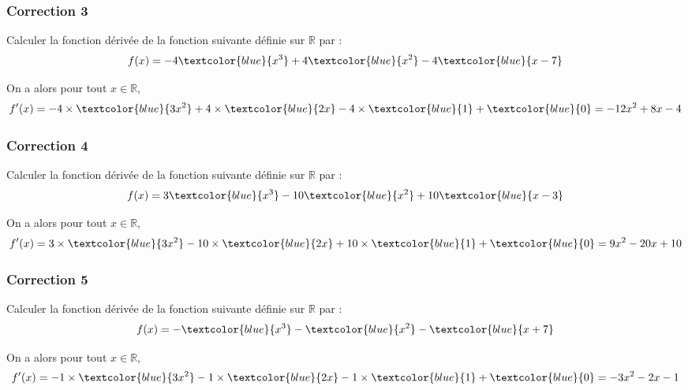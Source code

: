 \documentclass[15pt, mathserif]{beamer}
\newcommand{\R}{\mathbb{R}}			%
\begin{document}
\begin{frame}
\vspace{-10mm}
	\frametitle{Correction 3}
Calculer la fonction dérivée de la fonction suivante définie sur $\R$ par : $$f(x)=-4\textcolor{blue}{x^3}+4\textcolor{blue}{x^2}-4\textcolor{blue}{x-7}$$
 
 On a alors pour tout $x \in  \R$, $$f'(x)= -4\times \textcolor{blue}{3x^2} +4\times \textcolor{blue}{2x}-4\times \textcolor{blue}{1}+\textcolor{blue}{0}=-12x^2+8x-4$$\end{frame}


\begin{frame}
\vspace{-10mm}
	\frametitle{Correction 4}
Calculer la fonction dérivée de la fonction suivante définie sur $\R$ par : $$f(x)=3\textcolor{blue}{x^3}-10\textcolor{blue}{x^2}+10\textcolor{blue}{x-3}$$
 
 On a alors pour tout $x \in  \R$, $$f'(x)= 3\times \textcolor{blue}{3x^2} -10\times \textcolor{blue}{2x}+10\times \textcolor{blue}{1}+\textcolor{blue}{0}=9x^2-20x+10$$\end{frame}


\begin{frame}
\vspace{-10mm}
	\frametitle{Correction 5}
Calculer la fonction dérivée de la fonction suivante définie sur $\R$ par : $$f(x)=-\textcolor{blue}{x^3}-\textcolor{blue}{x^2}-\textcolor{blue}{x+7}$$
 
 On a alors pour tout $x \in  \R$, $$f'(x)= -1\times \textcolor{blue}{3x^2} -1\times \textcolor{blue}{2x}-1\times \textcolor{blue}{1}+\textcolor{blue}{0}=-3x^2-2x-1$$\end{frame}
\end{document}
